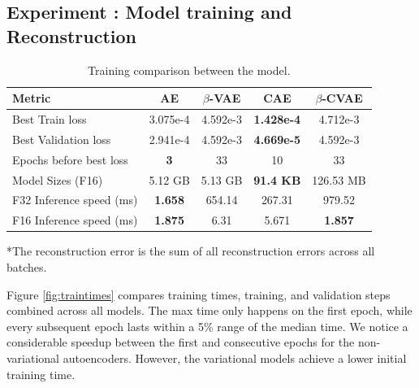 \subsection{Experiment : Model training and Reconstruction}

\begin{table}[!htbp]
    \centering
    \setlength{\tabcolsep}{10pt}
    \begin{tabular}{l cccc}
        \toprule
        \rowcolor{gray!20}
        \textbf{Metric} & \textbf{AE} & \textbf{$\beta$-VAE} & \textbf{CAE} & \textbf{$\beta$-CVAE} \\
        \midrule
        Best Train loss & 3.075e-4 & 4.592e-3 & \textbf{1.428e-4} & 4.712e-3 \\
        \rowcolor{gray!10} Best Validation loss & 2.941e-4 & 4.592e-3 & \textbf{4.669e-5} & 4.592e-3 \\
        Epochs before best loss & \textbf{3} & 33 & 10 & 33 \\
        \rowcolor{gray!10} Model Sizes (F16) & 5.12 GB & 5.13 GB & \textbf{91.4 KB} & 126.53 MB \\
        F32 Inference speed (ms) & \textbf{1.658} & 654.14 & 267.31 & 979.52 \\
        \rowcolor{gray!10} F16 Inference speed (ms) & \textbf{1.875} & 6.31 & 5.671 & \textbf{1.857} \\
        \bottomrule
    \end{tabular}
    \caption{Training comparison between the model.}
    \label{tab:modelresinfo}
    \smallskip
    \small{*The reconstruction error is the sum of all reconstruction errors across all batches.}
\end{table}

Figure \ref{fig:traintimes} compares training times, training, and validation steps combined across all models. The max time only happens on the first epoch, while every subsequent epoch lasts within a 5\% range of the median time. We notice a considerable speedup between the first and consecutive epochs for the non-variational autoencoders. However, the variational models achieve a lower initial training time. 

